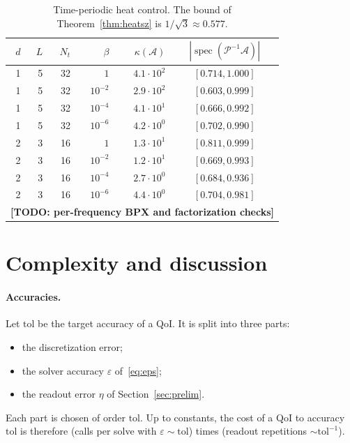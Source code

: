 \documentclass[11pt,a4paper]{article}
\newcommand{\A}{\mathcal{A}}
\newcommand{\todo}[1]{\textbf{[TODO: #1]}}
\theoremstyle{remark}
\begin{document}
\begin{table}[ht]
\centering\small
\begin{tabular}{rrrrrc}
\toprule
$d$ & $L$ & $N_t$ & $\beta$ & $\kappa(\A)$ & $|\operatorname{spec}(\mathcal P^{-1}\A)|$\\
\midrule
1 & 5 & 32 & $1$       & $4.1\cdot10^2$ & $[0.714,1.000]$\\
1 & 5 & 32 & $10^{-2}$ & $2.9\cdot10^2$ & $[0.603,0.999]$\\
1 & 5 & 32 & $10^{-4}$ & $4.1\cdot10^1$ & $[0.666,0.992]$\\
1 & 5 & 32 & $10^{-6}$ & $4.2\cdot10^0$ & $[0.702,0.990]$\\
\midrule
2 & 3 & 16 & $1$       & $1.3\cdot10^1$ & $[0.811,0.999]$\\
2 & 3 & 16 & $10^{-2}$ & $1.2\cdot10^1$ & $[0.669,0.993]$\\
2 & 3 & 16 & $10^{-4}$ & $2.7\cdot10^0$ & $[0.684,0.936]$\\
2 & 3 & 16 & $10^{-6}$ & $4.4\cdot10^0$ & $[0.704,0.981]$\\
\midrule
\multicolumn{6}{l}{\todo{per-frequency BPX and factorization checks}}\\
\bottomrule
\end{tabular}
\caption{Time-periodic heat control. The bound of Theorem~\ref{thm:heatsz} is
$1/\sqrt3\approx0.577$.}
\label{tab:heat}
\end{table}

\section{Complexity and discussion}\label{sec:discussion}

\paragraph{Accuracies.} Let $\mathrm{tol}$ be the target accuracy of a QoI. It is
split into three parts:
\begin{itemize}
\item the discretization error;
\item the solver accuracy $\varepsilon$ of~\eqref{eq:eps};
\item the readout error $\eta$ of Section~\ref{sec:prelim}.
\end{itemize}
Each part is chosen of order $\mathrm{tol}$. Up to constants, the cost of a QoI to
accuracy $\mathrm{tol}$ is therefore (calls per solve with $\varepsilon\sim\mathrm{tol}$) times
(readout repetitions $\sim\mathrm{tol}^{-1}$).
\end{document}
